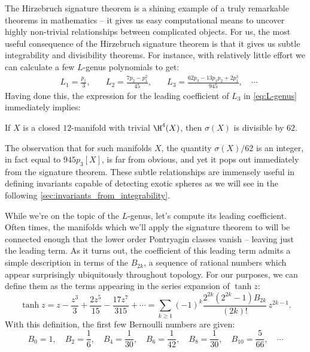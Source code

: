 The Hirzebruch signature theorem is a shining example of a truly remarkable theorems in mathematics -- it gives us easy computational means to uncover highly non-trivial relationships between complicated objects. For us, the most useful consequence of the Hirzebruch signature theorem is that it gives us subtle integrability and divisibility theorems. For instance, with relatively little effort we can calculate a few $L$-genus polynomials to get:
\begin{equation}\label{eq:L-genus}
	\begin{aligned}
		 & L_1 = \frac{p_1}{3},\quad
		 & L_2 = \frac{7p_2 - p_1^2}{45},\quad
		 & L_3 = \frac{62p_3 - 13p_1p_2 + 2p_1^3}{945},\quad\cdots
	\end{aligned}
\end{equation}
Having done this, the expression for the leading coefficient of $L_3$ in \cref{eq:L-genus} immediately implies:
\begin{corollary}
	If $X$ is a closed $12$-manifold with trivial $\H^4(X)$, then $\sigma(X)$ is divisible by $62$.
\end{corollary}
The observation that for such manifolds $X$, the quantity $\sigma(X)/62$ is an integer, in fact equal to $945p_3[X]$, is far from obvious, and yet it pops out immediately from the signature theorem. These subtle relationships are immensely useful in defining invariants capable of detecting exotic spheres as we will see in the following \cref{sec:invariants_from_integrability}.

While we're on the topic of the $L$-genus, let's compute its leading coefficient. Often times, the manifolds which we'll apply the signature theorem to will be connected enough that the lower order Pontryagin classes vanish -- leaving just the leading term.
As it turns out, the coefficient of this leading term admits a simple description in terms of the  $B_{2k}$, a sequence of rational numbers which appear surprisingly ubiquitously throughout topology. For our purposes, we can define them as the terms appearing in the series expansion of $\tanh z$:
\begin{equation}\label{eq:tanh_series}
	\tanh z = z - \frac{z^3}{3} + \frac{2z^5}{15} - \frac{17z^7}{315}+\cdots = \sum_{k\geq 1} (-1)^k\frac{2^{2k}(2^{2k}-1)B_{2k}}{(2k)!}\, z^{2k-1}.
\end{equation}
With this definition, the first few Bernoulli numbers are given:
\begin{equation}\label{eq:bernoulli_numbers}
	B_0 = 1,\quad B_2 = \frac{1}{6},\quad B_4 = \frac{1}{30},\quad B_6=\frac{1}{42},\quad B_{8}=\frac{1}{30},\quad B_{10} = \frac{5}{66},\quad\cdots
\end{equation}

